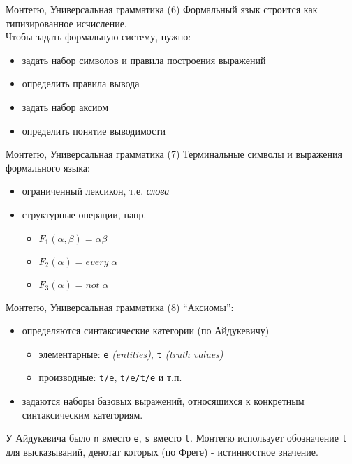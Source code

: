 \documentclass{beamer}
\begin{document}
\begin{frame}{Монтегю, Универсальная грамматика (6)}
Формальный язык строится как типизированное исчисление.\\
\bigskip
\bigskip
Чтобы задать формальную систему, нужно:\\
\begin{itemize}
  \item задать набор символов и правила построения выражений
  \item определить правила вывода
  \item задать набор аксиом
  \item определить понятие выводимости
\end{itemize}
\end{frame}

\begin{frame}{Монтегю, Универсальная грамматика (7)}
Терминальные символы и выражения формального языка:\\
\begin{itemize}
  \item ограниченный лексикон, т.е. \textit{слова}
  \item структурные операции, напр. 
    \begin{itemize}
      \item $F_1(\alpha, \beta) = \alpha \beta$
      \item $F_2(\alpha) = every \; \alpha$
      \item $F_3(\alpha) = not \; \alpha$
    \end{itemize}
\end{itemize}
\end{frame}

\begin{frame}{Монтегю, Универсальная грамматика (8)}
``Аксиомы'':\\
\begin{itemize}
  \item определяются синтаксические категории (по Айдукевичу)
    \begin{itemize}
      \item элементарные: \texttt{e} \textit{(entities)}, \texttt{t} \textit{(truth values)}
      \item производные: \texttt{t/e}, \texttt{t/e/t/e} и т.п.
    \end{itemize}
  \item задаются наборы базовых выражений, относящихся к конкретным синтаксическим категориям.
\end{itemize}
\bigskip
У Айдукевича было \texttt{n} вместо \texttt{e}, \texttt{s} вместо \texttt{t}. Монтегю использует обозначение \texttt{t} для высказываний, денотат которых (по Фреге) - истинностное значение.
\end{frame}
\end{document}
